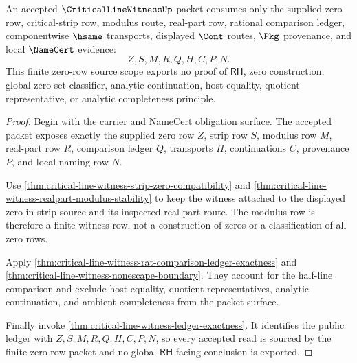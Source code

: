 \begin{theorem}
\label{thm:critical-line-witness-zero-row-scope}
An accepted $\CriticalLineWitnessUp$ packet consumes only the supplied zero row, critical-strip row, modulus route, real-part row, rational comparison ledger, componentwise $\hsame$ transports, displayed $\Cont$ routes, $\Pkg$ provenance, and local $\NameCert$ evidence:
$$
Z,S,M,R,Q,H,C,P,N.
$$
This finite zero-row source scope exports no proof of $\mathsf{RH}$, zero construction, global zero-set classifier, analytic continuation, host equality, quotient representative, or analytic completeness principle.
\end{theorem}
\begin{proof}
Begin with the carrier and NameCert obligation surface. The accepted packet exposes exactly the supplied zero row $Z$, strip row $S$, modulus row $M$, real-part row $R$, comparison ledger $Q$, transports $H$, continuations $C$, provenance $P$, and local naming row $N$.

Use \autoref{thm:critical-line-witness-strip-zero-compatibility} and \autoref{thm:critical-line-witness-realpart-modulus-stability} to keep the witness attached to the displayed zero-in-strip source and its inspected real-part route. The modulus row is therefore a finite witness row, not a construction of zeros or a classification of all zero rows.

Apply \autoref{thm:critical-line-witness-rat-comparison-ledger-exactness} and \autoref{thm:critical-line-witness-nonescape-boundary}. They account for the half-line comparison and exclude host equality, quotient representatives, analytic continuation, and ambient completeness from the packet surface.

Finally invoke \autoref{thm:critical-line-witness-ledger-exactness}. It identifies the public ledger with $Z,S,M,R,Q,H,C,P,N$, so every accepted read is sourced by the finite zero-row packet and no global $\mathsf{RH}$-facing conclusion is exported.
\end{proof}

